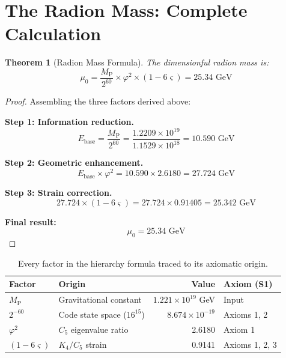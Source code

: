 \documentclass[11pt,a4paper]{article}
\newtheorem{theorem}{Theorem}[section]
\theoremstyle{definition}
\theoremstyle{remark}
\newcommand{\gr}{\varphi}
\newcommand{\gs}{\varsigma}
\newcommand{\murad}{\mu_0}
\newcommand{\Mpl}{M_{\mathrm{P}}}
\newcommand{\Ebase}{E_{\mathrm{base}}}
\begin{document}
\section{The Radion Mass: Complete Calculation}
\label{sec:radion}

\begin{theorem}[Radion Mass Formula]
\label{thm:radion}
The dimensionful radion mass is:
\begin{equation}
\boxed{\murad = \frac{\Mpl}{2^{60}} \times \gr^2 \times (1 - 6\gs) = 25.34 \text{ GeV}}
\end{equation}
\end{theorem}

\begin{proof}
Assembling the three factors derived above:

\textbf{Step 1: Information reduction.}
\begin{equation}
\Ebase = \frac{\Mpl}{2^{60}} = \frac{1.2209 \times 10^{19}}{1.1529 \times 10^{18}} = 10.590 \text{ GeV}
\end{equation}

\textbf{Step 2: Geometric enhancement.}
\begin{equation}
\Ebase \times \gr^2 = 10.590 \times 2.6180 = 27.724 \text{ GeV}
\end{equation}

\textbf{Step 3: Strain correction.}
\begin{equation}
27.724 \times (1 - 6\gs) = 27.724 \times 0.91405 = 25.342 \text{ GeV}
\end{equation}

\textbf{Final result:}
\begin{equation}
\murad = 25.34 \text{ GeV}
\end{equation}
\end{proof}

\begin{table}[H]
\centering
\begin{tabular}{llrl}
\toprule
\textbf{Factor} & \textbf{Origin} & \textbf{Value} & \textbf{Axiom (S1)} \\
\midrule
$\Mpl$ & Gravitational constant & $1.221 \times 10^{19}$ GeV & Input \\
$2^{-60}$ & Code state space ($16^{15}$) & $8.674 \times 10^{-19}$ & Axioms 1, 2 \\
$\gr^2$ & $C_5$ eigenvalue ratio & 2.6180 & Axiom 1 \\
$(1-6\gs)$ & $K_4/C_5$ strain & 0.9141 & Axioms 1, 2, 3 \\
\bottomrule
\end{tabular}
\caption{Every factor in the hierarchy formula traced to its axiomatic origin.}
\label{tab:factors}
\end{table}
\end{document}
